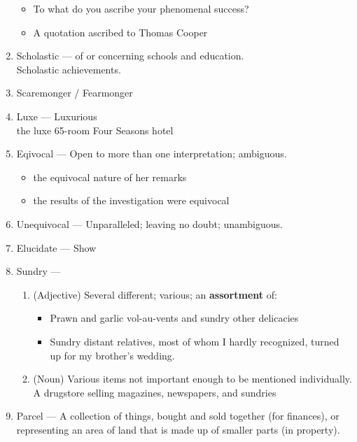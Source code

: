 \documentclass[oneside]{book}
\begin{document}
\begin{enumerate}
\begin{itemize}
        \item To what do you ascribe your phenomenal success?
        \item A quotation ascribed to Thomas Cooper
    \end{itemize} \normalsize
    \item Scholastic --- of or concerning schools and education.\\
    \footnotesize Scholastic achievements. \normalsize
    \item Scaremonger / Fearmonger 
    \item Luxe --- Luxurious\\
    \footnotesize the luxe 65-room Four Seasons hotel \normalsize
    \item Eqivocal --- Open to more than one interpretation; ambiguous.\\
    \begin{itemize}
        \item the equivocal nature of her remarks
        \item the results of the investigation were equivocal
    \end{itemize}
    \item Unequivocal --- Unparalleled; leaving no doubt; unambiguous.
    \item Elucidate --- Show
    \item Sundry --- \begin{enumerate}
        \item (Adjective) Several different; various; an \textbf{assortment} of:
        \begin{itemize}
            \item \footnotesize Prawn and garlic vol-au-vents and sundry other delicacies
            \item Sundry distant relatives, most of whom I hardly recognized, turned up for my brother's wedding. \normalsize
        \end{itemize}
        \item (Noun) Various items not important enough to be mentioned individually.\\
        \footnotesize A drugstore selling magazines, newspapers, and sundries \normalsize 
    \end{enumerate}
    \item Parcel --- A collection of things, bought and sold together (for finances), or representing an area of land that is made up of smaller parts (in property). \footnotesize
    \begin{itemize}

\end{itemize}
\end{enumerate}
\end{document}

